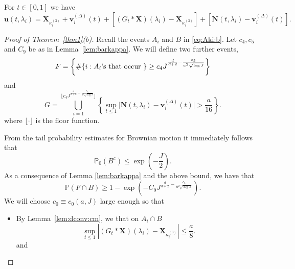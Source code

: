 \documentclass[12pt]{amsart}
\numberwithin{equation}{section}
\theoremstyle{definition}
\numberwithin{equation}{section}
\newcommand{\mP}{\mathbb{P}}
\newcommand{\X}{\mathbf{X}}
\newcommand{\N}{\mathbf{N}}
\newcommand{\uv}{\mathbf u}
\newcommand{\vv}{\mathbf v}
\begin{document}
For $t \in [0,1]$ we have
\begin{equation} 
  \label{eq:u:decompose}
\uv(t,\lambda_i) = \X_{\kappa^{(3)}_i} +\vv_i^{(\Delta)}(t) +\left[\left(G_t*\X\right)(\lambda_i) - \X_{\kappa^{(3)}_i}\right] + \left[\N(t,\lambda_i) -\vv_i^{(\Delta)}(t)\right].
\end{equation}




\begin{proof}[Proof of Theorem~\ref{thm1}(\textup{b})]
  Recall the events $ A_i$ and $B$ in \eqref{eq:Aki:b}. Let $c_4, c_5$ and $C_9$ be as in Lemma~\ref{lem:barkappa}. We will define two further events,
  \[ F = \left  \{ \#\{i :  \mbox{$ A_i$'s that occur } \}\geq c_4J^{\frac{d}{d+2} -\frac{c_5}{a^2 \sqrt{\log J}} }\right \} \]
  and
  \[ G =  \bigcup_{i=1}^{\big\lfloor c_4J^{\frac{d}{d+2} -\frac{c_5}{a^2 \sqrt{\log J} }}\big\rfloor} \left\{ \sup_{t\le 1} \Big\vert \N(t,{\lambda}_i) - \vv_i^{(\Delta)}(t)\Big\vert >\frac{a}{16}\right \}.\]
where $\lfloor\cdot\rfloor$ is the floor function.  

From the tail probability estimates for Brownian motion it immediately 
follows that
\[ \mP_0(B^c) \le \exp\left(-\frac{J}{2}\right).\] 
As a consequence of Lemma \ref{lem:barkappa} and the above bound, we have that 
\begin{equation} \label{eq:niabo}
\mP \left( F \cap B \right) 
\geq 1-\exp\left(-C_9 J^{\frac{d}{d+2}-\frac{c_5}{a^2 \sqrt{\log J} }}\right).  
\end{equation}
We will choose  $c_0 \equiv c_0(a,J)$ large enough so that
\begin{itemize}
  \item By Lemma~\ref{lem:dconv:cm},  we that on ${A_i} \cap B$
\begin{equation}
  \label{eq:1} \sup_{t\le 1}\left|(G_t *\X)(\lambda_i) - \X_{\kappa^{(3)}_i}\right|\le \frac{a}{8}.\end{equation} and


\end{itemize}
\end{proof}
\end{document}
